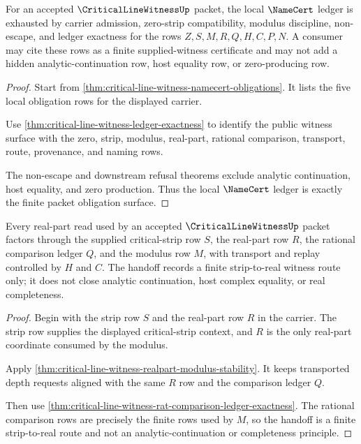 \begin{theorem}
\label{thm:critical-line-witness-namecert-ledger}
For an accepted $\CriticalLineWitnessUp$ packet, the local $\NameCert$ ledger is exhausted by carrier admission, zero-strip compatibility, modulus discipline, non-escape, and ledger exactness for the rows $Z,S,M,R,Q,H,C,P,N$. A consumer may cite these rows as a finite supplied-witness certificate and may not add a hidden analytic-continuation row, host equality row, or zero-producing row.
\end{theorem}
\begin{proof}
Start from \autoref{thm:critical-line-witness-namecert-obligations}. It lists the five local obligation rows for the displayed carrier.

Use \autoref{thm:critical-line-witness-ledger-exactness} to identify the public witness surface with the zero, strip, modulus, real-part, rational comparison, transport, route, provenance, and naming rows.

The non-escape and downstream refusal theorems exclude analytic continuation, host equality, and zero production. Thus the local $\NameCert$ ledger is exactly the finite packet obligation surface.
\end{proof}

\begin{theorem}
\label{thm:critical-line-witness-real-strip-handoff}
Every real-part read used by an accepted $\CriticalLineWitnessUp$ packet factors through the supplied critical-strip row $S$, the real-part row $R$, the rational comparison ledger $Q$, and the modulus row $M$, with transport and replay controlled by $H$ and $C$. The handoff records a finite strip-to-real witness route only; it does not close analytic continuation, host complex equality, or real completeness.
\end{theorem}
\begin{proof}
Begin with the strip row $S$ and the real-part row $R$ in the carrier. The strip row supplies the displayed critical-strip context, and $R$ is the only real-part coordinate consumed by the modulus.

Apply \autoref{thm:critical-line-witness-realpart-modulus-stability}. It keeps transported depth requests aligned with the same $R$ row and the comparison ledger $Q$.

Then use \autoref{thm:critical-line-witness-rat-comparison-ledger-exactness}. The rational comparison rows are precisely the finite rows used by $M$, so the handoff is a finite strip-to-real route and not an analytic-continuation or completeness principle.
\end{proof}

